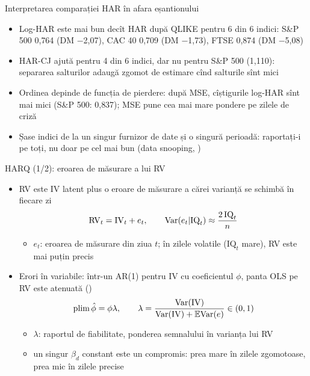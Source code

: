 \begin{frame}{Interpretarea comparației HAR în afara eșantionului}
\itemsize{\small}
\begin{itemize}
    \item Log-HAR este mai bun decît HAR după QLIKE pentru 6 din 6 indici: S\&P 500 0{,}764 (DM \ensuremath{-}2{,}07), CAC 40 0{,}709 (DM \ensuremath{-}1{,}73), FTSE 0{,}874 (DM \ensuremath{-}5{,}08)
    \item HAR-CJ ajută pentru 4 din 6 indici, dar nu pentru S\&P 500 (1{,}110): separarea salturilor adaugă zgomot de estimare cînd salturile sînt mici
    \item Ordinea depinde de funcția de pierdere: după MSE, cîștigurile log-HAR sînt mai mici (S\&P 500: 0{,}837); MSE pune cea mai mare pondere pe zilele de criză
    \item Șase indici de la un singur furnizor de date și o singură perioadă: raportați-i pe toți, nu doar pe cel mai bun (data snooping, )
\end{itemize}
\end{frame}

\begin{frame}{HARQ (1/2): eroarea de măsurare a lui RV}
\itemsize{\small}
\begin{itemize}
    \item RV este IV latent plus o eroare de măsurare a cărei varianță se schimbă în fiecare zi
    \[ \mathrm{RV}_t = \mathrm{IV}_t + e_t, \qquad \text{Var}(e_t | \mathrm{IQ}_t) \approx \frac{2\,\mathrm{IQ}_t}{n} \]
    \begin{itemize}
        \item $e_t$: eroarea de măsurare din ziua $t$; în zilele volatile ($\mathrm{IQ}_t$ mare), RV este mai puțin precis
    \end{itemize}
    \item Erori în variabile: într-un AR(1) pentru IV cu coeficientul $\phi$, panta OLS pe RV este atenuată ()
    \[ \mathrm{plim}\,\hat\phi = \phi\lambda, \qquad \lambda = \frac{\text{Var}(\mathrm{IV})}{\text{Var}(\mathrm{IV}) + \mathbb{E}\text{Var}(e)} \in (0, 1) \]
    \begin{itemize}
        \item $\lambda$: raportul de fiabilitate, ponderea semnalului în varianța lui RV
        \item un singur $\beta_d$ constant este un compromis: prea mare în zilele zgomotoase, prea mic în zilele precise
    \end{itemize}
\end{itemize}
\end{frame}

